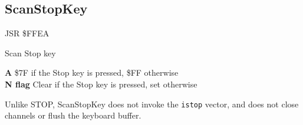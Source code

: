 
\newpage
\subsection{ScanStopKey}
\label{KERNAL Jump Table!ScanStopKey}
\begin{description}[leftmargin=2cm,style=nextline]
    \item [Address:] JSR \$FFEA
    \item [Description:] Scan Stop key
    \item [Outputs:]
        \textbf{A} \$7F if the Stop key is pressed, \$FF otherwise \\
        \textbf{N flag} Clear if the Stop key is pressed, set otherwise
    \item [Remarks:]
        Unlike STOP, ScanStopKey does not invoke the \texttt{istop} vector, and does not close channels or flush the keyboard buffer.
    \item [Example:]
\end{description}



\newpage
